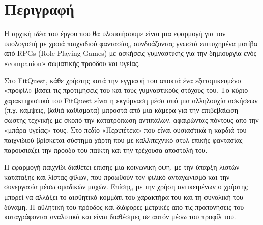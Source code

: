 \section{Περιγραφή}
  \par
  Η αρχική ιδέα του έργου που θα υλοποιήσουμε είναι μια εφαρμογή για τον υπολογιστή με χροιά παιχνιδιού φαντασίας, συνδυάζοντας γνωστά επιτυχημένα μοτίβα από RPGs (Role Playing Games) με ασκήσεις γυμναστικής για την δημιουργία ενός «companion» σωματικής προόδου και υγείας.
  \par
  Στο FitQuest, κάθε χρήστης κατά την εγγραφή του αποκτά ένα εξατομικευμένο «προφίλ» βάσει τις προτιμήσεις του και τους γυμναστικούς στόχους του. Το κύριο χαρακτηριστικό του FitQuest είναι η εκγύμναση μέσα από μια αλληλουχία ασκήσεων (π.χ. κάμψεις, βαθιά καθίσματα) μπροστά από μια κάμερα για την επιβεβαίωση σωστής τεχνικής με σκοπό την κατατρόπωση αντιπάλων, αφαιρώντας πόντους απο την «μπάρα υγείας» τους. Στο πεδίο «Περιπέτεια» που είναι ουσιαστικά η καρδιά του παιχνιδιού βρίσκεται σύστημα χάρτη που με καλλιτεχνικό στυλ επικής φαντασίας παρουσιάζει την πρόοδο του παίκτη και την τρέχουσα αποστολή του.
  \par
  Η εφαρμογή-παιχνίδι διαθέτει επίσης μια κοινωνική όψη, με την ύπαρξη λιστών κατάταξης και λίστας φίλων, που προωθούν τον φιλικό ανταγωνισμό και την συνεργασία μέσω ομαδικών μαχών. Επίσης, με την χρήση αντικειμένων ο χρήστης μπορεί να αλλάξει το αισθητικό κομμάτι του χαρακτήρα του και τη συνολική του δύναμη. Η αθλητική του πρόοδος και διάφορες μετρικές απο τις προπονήσεις του καταγράφονται αναλυτικά και είναι διαθέσιμες σε αυτόν μέσω του προφίλ του. 
